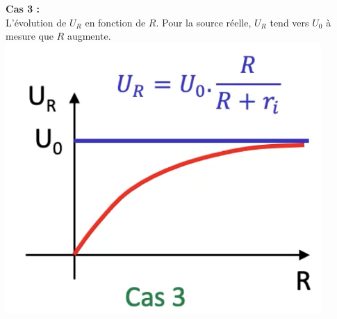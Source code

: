 \hfill
\vline
\hfill
\begin{minipage}[t]{0.3\textwidth}    \small
\textbf{Cas 3 :}\\
 L'évolution de $U_R$ en fonction de $R$. Pour la source réelle, $U_R$ tend vers $U_0$ à mesure que $R$ augmente.
\vfill \centering
\includegraphics[width=0.90\textwidth]{chapters/chapter1/images/cas3.png}
\end{minipage}

